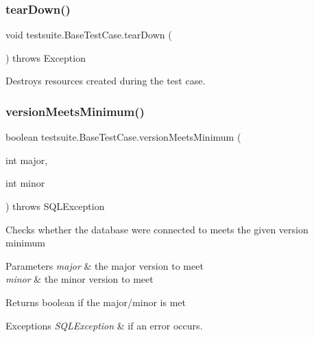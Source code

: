 \subsubsection{\texorpdfstring{tear\+Down()}{tearDown()}}
{\footnotesize\ttfamily void testsuite.\+Base\+Test\+Case.\+tear\+Down (\begin{DoxyParamCaption}{ }\end{DoxyParamCaption}) throws Exception}

Destroys resources created during the test case. \mbox{\label{classtestsuite_1_1_base_test_case_a4098e9a480c1907875ded976cdbc81a3}} 
\subsubsection{\texorpdfstring{version\+Meets\+Minimum()}{versionMeetsMinimum()}\hspace{0.1cm}{\footnotesize\ttfamily [1/2]}}
{\footnotesize\ttfamily boolean testsuite.\+Base\+Test\+Case.\+version\+Meets\+Minimum (\begin{DoxyParamCaption}\item[{int}]{major,  }\item[{int}]{minor }\end{DoxyParamCaption}) throws S\+Q\+L\+Exception\hspace{0.3cm}{\ttfamily [protected]}}

Checks whether the database we\textquotesingle{}re connected to meets the given version minimum


\begin{DoxyParams}{Parameters}
{\em major} & the major version to meet \\
\hline
{\em minor} & the minor version to meet\\
\hline
\end{DoxyParams}
\begin{DoxyReturn}{Returns}
boolean if the major/minor is met
\end{DoxyReturn}

\begin{DoxyExceptions}{Exceptions}
{\em S\+Q\+L\+Exception} & if an error occurs. \\
\hline
\end{DoxyExceptions}
\mbox{\label{classtestsuite_1_1_base_test_case_a13e93e8347469a0c2e8dbf3be8795bb5}} 
